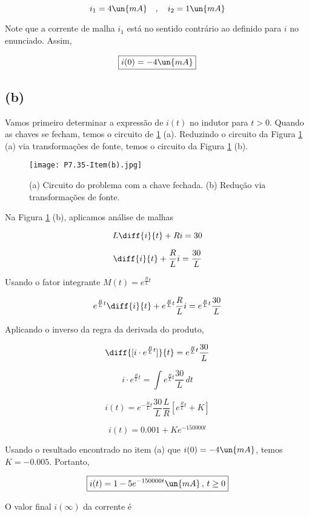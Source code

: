 \endgroup

\[ i_1 = 4 \un{mA} \quad , \quad i_2 = 1 \un{mA}   \]

Note que a corrente de malha $i_1$ está no sentido contrário ao definido para $i$ no enunciado. Assim, 

\[ \boxed{i(0) = - 4 \un{mA}}  \]

\subsection*{(b)}

Vamos primeiro determinar a expressão de $i(t)$ no indutor para $t>0$. Quando as chaves se fecham, temos o circuito
de \ref*{fig:7.35.1} (a). Reduzindo o circuito da Figura \ref*{fig:7.35.1} (a) via transformações de fonte, 
temos o circuito da Figura \ref*{fig:7.35.1} (b).

\begin{figure}[!htbp]
    \centering
    \caption{(a) Circuito do problema com a chave fechada. (b) Redução via transformações de fonte.}
      \centering
      \texttt{[image: P7.35-Item(b).jpg]} \\
    \label{fig:7.35.1}
\end{figure}

Na Figura \ref*{fig:7.35.1} (b), aplicamos análise de malhas   

\[ L\diff{i}{t} + Ri = 30 \]

\[ \diff{i}{t} + \frac{R}{L}i = \frac{30}{L} \]

Usando o fator integrante $M(t) = e^{\frac{R}{L}t}$

\[ e^{\frac{R}{L}t}\diff{i}{t} + e^{\frac{R}{L}t}\frac{R}{L}i = e^{\frac{R}{L}t}\frac{30}{L} \]

Aplicando o inverso da regra da derivada do produto,

\[ \diff{[i \cdot e^{\frac{R}{L}t}]}{t} = e^{\frac{R}{L}t}\frac{30}{L} \]

\[ i \cdot e^{\frac{R}{L}t} = \int e^{\frac{R}{L}t}\frac{30}{L} \, dt  \]

\[ i(t)  = e^{- \frac{R}{L}t} \frac{30}{L} \frac{L}{R} \left[e^{\frac{R}{L}t} + K\right] \]

\[ i(t)  = 0.001 + Ke^{- 150000t} \]

Usando o resultado encontrado no item (a) que $i(0) = - 4 \un{mA}$, temos $K = - 0.005$. Portanto,   

\[ \boxed{i(t) = 1 - 5e^{- 150000t} \un{mA} \, , \, t \geq 0}  \]

O valor final $i(\infty)$ da corrente é    

